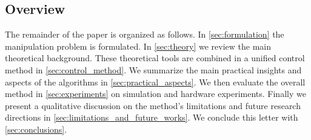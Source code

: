 
\subsection{Overview}

The remainder of the paper is organized as follows. In 
\sect \ref{sec:formulation} the manipulation problem is formulated. In \sect \ref{sec:theory} we review the main theoretical background. These  theoretical tools are combined in a unified control method in \sect \ref{sec:control_method}. We summarize the main practical insights and aspects of the algorithms in \sect \ref{sec:practical_aspects}.
We then evaluate the overall method in \sect \ref{sec:experiments} on simulation and hardware experiments. Finally we present a qualitative discussion on the method's limitations and future research directions in \sect \ref{sec:limitations_and_future_works}. We conclude this letter with \sect \ref{sec:conclusions}.
